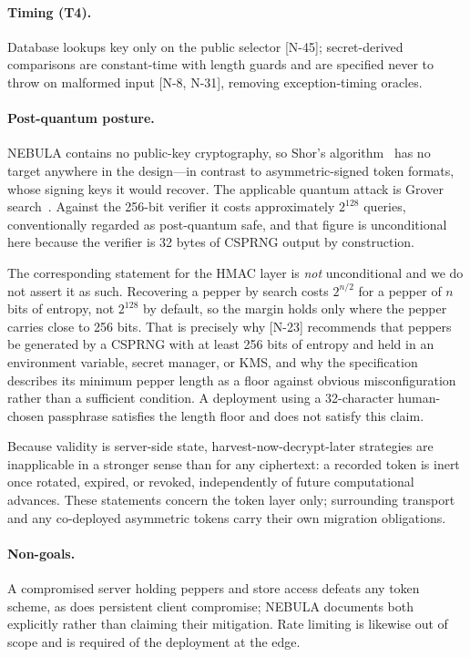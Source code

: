 \documentclass[11pt]{article}
\begin{document}
\paragraph{Timing (T4).} Database lookups key only on the public selector
[N-45]; secret-derived comparisons are constant-time with length guards and
are specified never to throw on malformed input [N-8, N-31], removing
exception-timing oracles.

\paragraph{Post-quantum posture.} NEBULA contains no public-key cryptography,
so Shor's algorithm~\cite{shor1997} has no target anywhere in the design---in
contrast to asymmetric-signed token formats, whose signing keys it would
recover. The applicable quantum attack is Grover search~\cite{grover1996}.
Against the 256-bit verifier it costs approximately $2^{128}$ queries,
conventionally regarded as post-quantum safe, and that figure is
unconditional here because the verifier is 32 bytes of CSPRNG output by
construction.

The corresponding statement for the HMAC layer is \emph{not} unconditional
and we do not assert it as such. Recovering a pepper by search costs
$2^{n/2}$ for a pepper of $n$ bits of entropy, not $2^{128}$ by default, so
the margin holds only where the pepper carries close to 256 bits. That is
precisely why [N-23] recommends that peppers be generated by a CSPRNG with
at least 256 bits of entropy and held in an environment variable,
secret manager, or KMS, and why the specification describes its minimum
pepper length as a floor against obvious misconfiguration rather than a
sufficient condition. A deployment using a 32-character human-chosen
passphrase satisfies the length floor and does not satisfy this claim.

Because validity is server-side state, harvest-now-decrypt-later strategies
are inapplicable in a stronger sense than for any ciphertext: a recorded
token is inert once rotated, expired, or revoked, independently of future
computational advances. These statements concern the token layer only;
surrounding transport and any co-deployed asymmetric tokens carry their own
migration obligations.

\paragraph{Non-goals.} A compromised server holding peppers and store access
defeats any token scheme, as does persistent client compromise; NEBULA
documents both explicitly rather than claiming their mitigation. Rate
limiting is likewise out of scope and is required of the deployment at the
edge.
\end{document}
